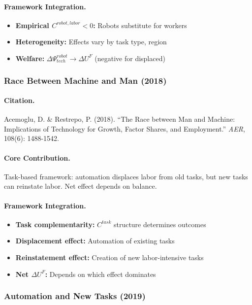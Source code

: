 \paragraph{Framework Integration.}
\begin{itemize}
  \item \textbf{Empirical $C^{robot,labor} < 0$:} Robots substitute for workers
  \item \textbf{Heterogeneity:} Effects vary by task type, region
  \item \textbf{Welfare:} $\Delta\Psi_{tech}^{robot} \to \Delta U^F$ (negative for displaced)
\end{itemize}

\subsubsection{Race Between Machine and Man (2018)}

\paragraph{Citation.}
Acemoglu, D. \& Restrepo, P. (2018).
``The Race between Man and Machine: Implications of Technology for Growth,
Factor Shares, and Employment.'' \emph{AER}, 108(6): 1488-1542.

\paragraph{Core Contribution.}
Task-based framework: automation displaces labor from old tasks,
but new tasks can reinstate labor. Net effect depends on balance.

\paragraph{Framework Integration.}
\begin{itemize}
  \item \textbf{Task complementarity:} $C^{task}$ structure determines outcomes
  \item \textbf{Displacement effect:} Automation of existing tasks
  \item \textbf{Reinstatement effect:} Creation of new labor-intensive tasks
  \item \textbf{Net $\Delta U^F$:} Depends on which effect dominates
\end{itemize}

\subsubsection{Automation and New Tasks (2019)}

